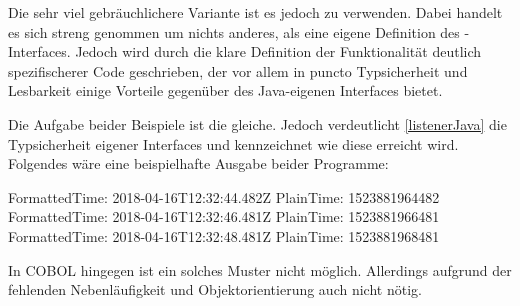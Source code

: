
Die sehr viel gebräuchlichere Variante ist es jedoch  zu verwenden. Dabei handelt es sich streng genommen um nichts anderes, als eine eigene Definition des -Interfaces. Jedoch wird durch die klare Definition der Funktionalität deutlich spezifischerer Code geschrieben, der vor allem in puncto Typsicherheit und Lesbarkeit einige Vorteile gegenüber des Java-eigenen Interfaces bietet.


Die Aufgabe beider Beispiele ist die gleiche. Jedoch verdeutlicht \autoref{listenerJava} die Typsicherheit eigener Interfaces und kennzeichnet wie diese erreicht wird. Folgendes wäre eine beispielhafte Ausgabe beider Programme:

\begin{shellwindow}
FormattedTime: 2018-04-16T12:32:44.482Z
PlainTime: 1523881964482
FormattedTime: 2018-04-16T12:32:46.481Z
PlainTime: 1523881966481
FormattedTime: 2018-04-16T12:32:48.481Z
PlainTime: 1523881968481
\end{shellwindow}

In COBOL hingegen ist ein solches Muster nicht möglich. Allerdings aufgrund der fehlenden Nebenläufigkeit und Objektorientierung auch nicht nötig.